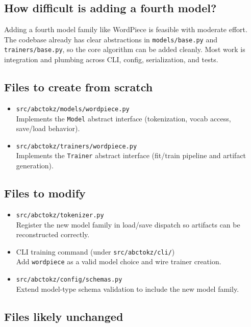 \documentclass{article}
\begin{document}
\subsection{How difficult is adding a fourth model?}

Adding a fourth model family like WordPiece is feasible with moderate effort.  
The codebase already has clear abstractions in \texttt{models/base.py} and \texttt{trainers/base.py}, so the core algorithm can be added cleanly.  
Most work is integration and plumbing across CLI, config, serialization, and tests.

\subsection{Files to create from scratch}

\begin{itemize}
    \item \texttt{src/abctokz/models/wordpiece.py} \\
    Implements the \texttt{Model} abstract interface (tokenization, vocab access, save/load behavior).
    \item \texttt{src/abctokz/trainers/wordpiece.py} \\
    Implements the \texttt{Trainer} abstract interface (fit/train pipeline and artifact generation).
\end{itemize}


\subsection{Files to modify}

\begin{itemize}
    \item \texttt{src/abctokz/tokenizer.py} \\
    Register the new model family in load/save dispatch so artifacts can be reconstructed correctly.
    \item CLI training command (under \texttt{src/abctokz/cli/}) \\
    Add \texttt{wordpiece} as a valid model choice and wire trainer creation.
    \item \texttt{src/abctokz/config/schemas.py} \\
    Extend model-type schema validation to include the new model family.
\end{itemize}


\subsection{Files likely unchanged}
\end{document}
